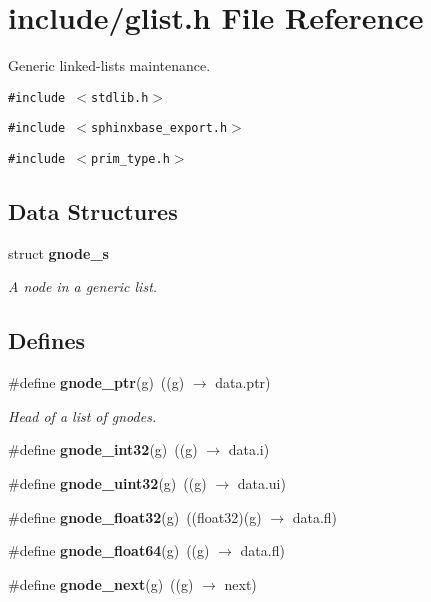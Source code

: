 \section{include/glist.h File Reference}
\label{glist_8h}
Generic linked-lists maintenance.  


{\tt \#include $<$stdlib.h$>$}\par
{\tt \#include $<$sphinxbase\_\-export.h$>$}\par
{\tt \#include $<$prim\_\-type.h$>$}\par
\subsection*{Data Structures}
\begin{CompactItemize}
\item 
struct {\bf gnode\_\-s}
\begin{CompactList}\small\item\em A node in a generic list. \item\end{CompactList}\end{CompactItemize}
\subsection*{Defines}
\begin{CompactItemize}
\item 
\#define {\bf gnode\_\-ptr}(g)~((g) $\rightarrow$ data.ptr)
\begin{CompactList}\small\item\em Head of a list of gnodes. \item\end{CompactList}\item 
\#define \textbf{gnode\_\-int32}(g)~((g) $\rightarrow$ data.i)\label{glist_8h_7daab0205c40d1b449529ee4cc54522b}

\item 
\#define \textbf{gnode\_\-uint32}(g)~((g) $\rightarrow$ data.ui)\label{glist_8h_3af0cc8d5d612e85fa433ac3edf42fd6}

\item 
\#define \textbf{gnode\_\-float32}(g)~((float32)(g) $\rightarrow$ data.fl)\label{glist_8h_af6a2bdc69642303426c20fc0bdfa5f6}

\item 
\#define \textbf{gnode\_\-float64}(g)~((g) $\rightarrow$ data.fl)\label{glist_8h_bfea8eee77afc1e3046ef33ae6c0f5b4}

\item 
\#define \textbf{gnode\_\-next}(g)~((g) $\rightarrow$ next)\label{glist_8h_33fc794db097ba2a5a36eba12c418993}

\end{CompactItemize}
